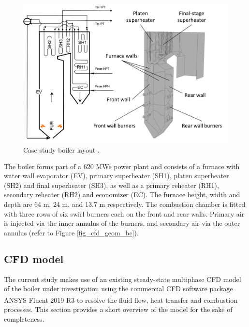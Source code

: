 \documentclass[a4paper,fleqn]{cas-sc}
\begin{document}
\begin{figure}[h!]
	\centering
		\includegraphics[scale=0.5]{CASE_STUDY_BOILER}
	  \caption{Case study boiler layout \citep{Rousseau2020}.}\label{fig_case_layout}
\end{figure}

The boiler forms part of a 620 MWe power plant and consists of a furnace with water wall evaporator (EV), primary superheater (SH1), platen superheater (SH2) and final superheater (SH3), as well as a primary reheater (RH1), secondary reheater (RH2) and economizer (EC).  The furnace height, width and depth are 64 m, 24 m, and 13.7 m respectively.  The combustion chamber is fitted with three rows of six swirl burners each on the front and rear walls.  Primary air is injected via the inner annulus of the burners, and secondary air via the outer annulus (refer to Figure \ref{fig_cfd_geom_bc}).

\subsection{CFD model}
The current study makes use of an existing steady-state multiphase CFD model \cite{Rawlins2021, INFUB2022} of the boiler under investigation using the commercial CFD software package ANSYS Fluent\textsuperscript{\textregistered} 2019 R3 to resolve the fluid flow, heat transfer and combustion processes. This section provides a short overview of the model for the sake of completeness.\\
\end{document}
